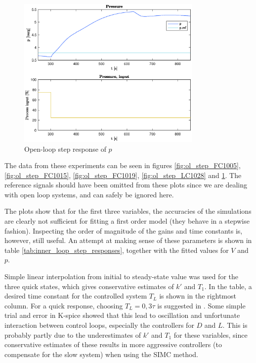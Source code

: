 \documentclass[12pt]{article}
\begin{document}
\begin{figure}
\centering
\includegraphics[width=0.8\textwidth]{../Systemanalyse/Log_Data_to_Matlab/Figurer/Stegeksperimenter/PC1024.eps}
\caption{Open-loop step response of $p$}
\label{fig:ol_step_PC1024}
\end{figure}

The data from these experiments can be seen in figures \ref{fig:ol_step_FC1005}, \ref{fig:ol_step_FC1015}, \ref{fig:ol_step_FC1019}, \ref{fig:ol_step_LC1028} and \ref{fig:ol_step_PC1024}. The reference signals should have been omitted from these plots since we are dealing with open loop systems, and can safely be ignored here.

The plots show that for the first three variables, the accuracies of the simulations are clearly not sufficient for fitting a first order model (they behave in a stepwise fashion). Inspecting the order of magnitude of the gains and time constants is, however, still useful. An attempt at making sense of these parameters is shown in table \ref{tab:inner_loop_step_responses}, together with the fitted values for $V$ and $p$.

Simple linear interpolation from initial to steady-state value was used for the three quick states, which gives conservative estimates of $k'$ and $T_1$. In the table, a desired time constant for the controlled system $T_L$ is shown in the rightmost column. For a quick response, choosing $T_L = 0,3\tau$ is suggested in \cite{balchen}. Some simple trial and error in K-spice showed that this lead to oscillation and unfortunate interaction between control loops, especially the controllers for $D$ and $L$. This is probably partly due to the underestimates of $k'$ and $T_1$ for these variables, since conservative estimates of these results in more aggressive controllers (to compensate for the slow system) when using the SIMC method.
\end{document}
